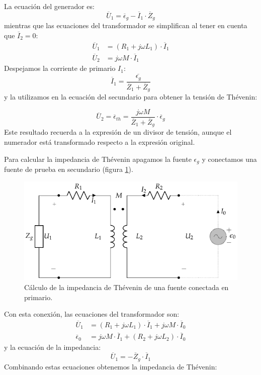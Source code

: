 La ecuación del generador es:
\[
  \overline{U}_1 = \overline{\epsilon}_g - \overline{I}_1 \cdot \overline{Z}_g
\]
mientras que las ecuaciones del transformador se simplifican al tener en cuenta que $\overline{I}_2 = 0$:
\begin{align*}
  \overline{U}_1 &= (R_1 + j \omega L_1) \cdot \overline{I}_1\\
  \overline{U}_2 &= j \omega M \cdot \overline{I}_1
\end{align*}
Despejamos la corriente de primario $I_1$:
\[
  \overline{I}_1 = \frac{\overline{\epsilon_g}}{\overline{Z}_1 + \overline{Z}_g}
\]
y la utilizamos en la ecuación del secundario para obtener la tensión de Thévenin:

\begin{equation}
  \label{eq:trafo-real-tension-thevenin}
  \overline{U}_2 = \boxed{\overline{\epsilon}_{th} = \frac{j\omega M}{\overline{Z}_1 + \overline{Z}_g} \cdot \overline{\epsilon}_g}
\end{equation}
Este resultado recuerda a la expresión de un divisor de tensión, aunque el numerador está transformado respecto a la expresión original.

Para calcular la impedancia de Thévenin apagamos la fuente $\epsilon_g$ y conectamos una fuente de prueba en secundario (figura \ref{fig:trafo-real-impedancia-thevenin}). 
\begin{figure}
  \centering
  \includegraphics[height=.2\textheight]{../figs/Trafo_Real_ImpedanciaPrimario.pdf}
    \caption{Cálculo de la impedancia de Thévenin de una fuente conectada en primario.}
  \label{fig:trafo-real-impedancia-thevenin}
\end{figure}
Con esta conexión, las ecuaciones del transformador son:
\begin{align*}
  \overline{U}_1 &= (R_1 + j \omega L_1) \cdot \overline{I}_1 + j \omega M \cdot\overline{I}_0\\
  \overline{\epsilon}_0 &= j \omega M \cdot \overline{I}_1 + (R_2 + j \omega L_2) \cdot \overline{I}_0
\end{align*}
y la ecuación de la impedancia:
\[
  \overline{U}_1 = - \overline{Z}_g \cdot \overline{I}_1
\]
Combinando estas ecuaciones obtenemos la impedancia de Thévenin:

